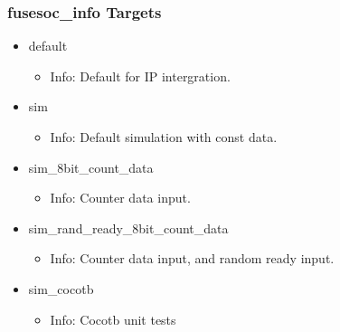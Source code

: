 \subsubsection{fusesoc\_info Targets}
\begin{itemize}
\item default
	\begin{itemize}
	\item[$\space$] Info: Default for IP intergration.
	\end{itemize}
\item sim
	\begin{itemize}
	\item[$\space$] Info: Default simulation with const data.
	\end{itemize}
\item sim\_8bit\_count\_data
	\begin{itemize}
	\item[$\space$] Info: Counter data input.
	\end{itemize}
\item sim\_rand\_ready\_8bit\_count\_data
	\begin{itemize}
	\item[$\space$] Info: Counter data input, and random ready input.
	\end{itemize}
\item sim\_cocotb
	\begin{itemize}
	\item[$\space$] Info: Cocotb unit tests
	\end{itemize}
\end{itemize}
